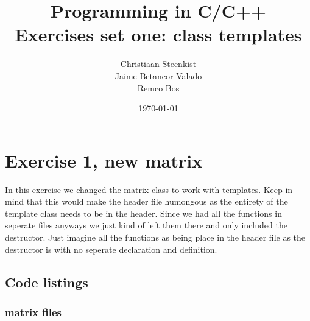 \documentclass[11pt]{article}
\begin{document}
\title{Programming in C/C++ \\
       Exercises set one: class templates
}
\date{\today}
\author{Christiaan Steenkist \\
Jaime Betancor Valado \\
Remco Bos \\
}

\maketitle
\section*{Exercise 1, new matrix}
In this exercise we changed the matrix class to work with templates.
Keep in mind that this would make the header file humongous as the entirety of the template class needs to be in the header.
Since we had all the functions in seperate files anyways we just kind of left them there and only included the destructor.
Just imagine all the functions as being place in the header file as the destructor is with no seperate declaration and definition.

\subsection*{Code listings}




\subsubsection*{matrix files}















\end{document}

